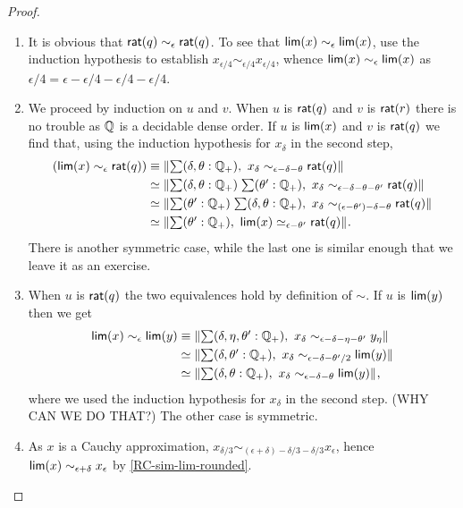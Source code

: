 \begin{proof}
  \mbox{}
  \begin{enumerate}

  \item 
    It is obvious that $\mathsf{rat}(q) \sim_\epsilon \mathsf{rat}(q)$. To see that $\mathsf{lim}(x)
    \sim_\epsilon \mathsf{lim}(x)$, use the induction hypothesis to establish $x_{\epsilon/4}
    \sim_{\epsilon/4} x_{\epsilon/4}$, whence $\mathsf{lim}(x) \sim_\epsilon \mathsf{lim}(x)$ as
    $\epsilon/4 = \epsilon - \epsilon/4 - \epsilon/4 - \epsilon/4$.

  \item We proceed by induction on $u$ and $v$. When $u$ is $\mathsf{rat}(q)$ and $v$ is
    $\mathsf{rat}(r)$ there is no trouble as $\mathbb{Q}$ is a decidable dense order. If $u$ is
    $\mathsf{lim}(x)$ and $v$ is $\mathsf{rat}(q)$ we find that, using the induction hypothesis for
    $x_\delta$ in the second step,
    \begin{align*}
      (\rclim(x) \sim_\epsilon \rcrat(q))
      &\jdeq
      \brck{\sm{\delta, \theta : \Qp} x_\delta \sim_{\epsilon - \delta - \theta} \rcrat(q)}
      \\
      &\simeq
      \brck{\sm{\delta, \theta : \Qp}{\theta' : \Qp}
        x_\delta \sim_{\epsilon - \delta - \theta - \theta'} \rcrat(q)}
      \\
      &\simeq
      \brck{\sm{\theta' : \Qp}{\delta, \theta : \Qp}
          x_\delta \sim_{(\epsilon - \theta') - \delta - \theta} \rcrat(q)}
      \\
      &\simeq
      \brck{\sm{\theta' : \Qp} \rclim(x) \simeq_{\epsilon - \theta'} \rcrat(q)}.
    \end{align*}
    There is another symmetric case, while the last one is similar enough that we leave it
    as an exercise.

  \item When $u$ is $\mathsf{rat}(q)$ the two equivalences hold by definition of $\sim$. If
    $u$ is $\mathsf{lim}(y)$ then we get
    \begin{align*}
      \rclim(x) \sim_\epsilon \rclim(y) &\jdeq
      \brck{\sm{\delta, \eta, \theta' : \Qp}
        x_\delta \sim_{\epsilon - \delta - \eta - \theta'} y_\eta}
      \\
      &\simeq
      \brck{\sm{\delta, \theta' : \Qp}
        x_\delta \sim_{\epsilon - \delta - \theta'/2} \rclim(y)}
      \\
      &\simeq
      \brck{\sm{\delta, \theta : \Qp} x_\delta \sim_{\epsilon - \delta - \theta} \rclim(y)},
    \end{align*}
    where we used the induction hypothesis for $x_\delta$ in the second step. (WHY CAN WE
    DO THAT?) The other case is symmetric.

  \item As $x$ is a Cauchy approximation, $x_{\delta/3} \sim_{(\epsilon + \delta) -
      \delta/3 - \delta/3} x_\epsilon$, hence $\mathsf{lim}(x) \sim_{\epsilon + \delta}
    x_\epsilon$ by \autoref{RC-sim-lim-rounded}.
  \end{enumerate}
\end{proof}

